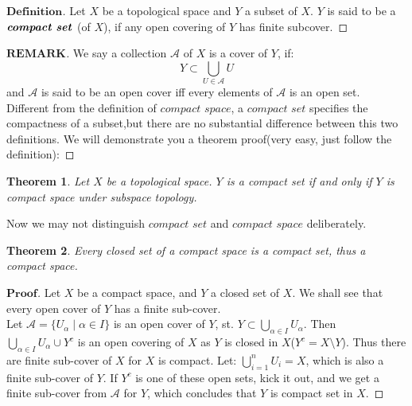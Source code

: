 \documentclass[a4paper, 11pt]{article}
\newtheorem{theorem}{Theorem}
\theoremstyle{definition}
\theoremstyle{remark}
\newenvironment{myremark}
{\renewcommand\qedsymbol{$ $}\begin{proof}[$\mathbf{REMARK}$]}
  {\end{proof}}
\newenvironment{myprf}
{\renewcommand\qedsymbol{$ $}\begin{proof}[$\mathbf{Proof}$]}
  {\end{proof}}
\newenvironment{mydef}
{\renewcommand\qedsymbol{$ $}\begin{proof}[$\mathbf{Definition}$]}
  {\end{proof}}
\theoremstyle{definition}
\begin{document}
\vspace{0.5cm}
\begin{mydef}
      Let $X$ be a topological space and $Y$ a subset of $X$. $Y$ is said to be 
      a $\textbf{\textit{compact set}}$ (of $X$), 
      if any open covering of $Y$ has finite subcover.
\end{mydef}
\begin{myremark}
        We say a collection $\mathcal{A}$ of $X$ is a cover of $Y$, if:
        $$
        Y\subset \bigcup_{U\in \mathcal{A}}U
        $$ and $\mathcal{A}$ is said to be an open cover iff every elements of
        $\mathcal{A}$ is an open set.\\
        \indent Different from the definition of $\textit{compact space}$, a
        $\textit{compact set}$ specifies the compactness of a subset,but there
        are no substantial difference between this two definitions. We will
        demonstrate you a theorem proof(very easy, just follow the 
        definition):
\end{myremark}
\begin{theorem}
        Let $X$ be a topological space. $Y$ is a compact set if and only if $Y$
        is compact space under subspace topology.
\end{theorem}
\noindent
Now we may not distinguish $\textit{compact set}$ and $\textit{compact space}$ 
deliberately.
\vspace{0.5cm}
\begin{theorem}
        Every closed set of a compact space is a compact set, thus a compact
        space.
\end{theorem}
\begin{myprf}
       Let $X$ be a compact space, and $Y$ a closed set of $X$. We shall see that
       every open cover of $Y$ has a finite sub-cover.\\
       \indent Let $\mathcal{A}=\{U_{\alpha}\mid \alpha\in I\}$ is an open cover
       of $Y$, st. $Y\subset \displaystyle \bigcup_{\alpha\in I} U_{\alpha}$.
       Then $\displaystyle \bigcup_{\alpha\in I}U_{\alpha} \cup Y^{c}$ is an open
       covering of $X$ as $Y$ is closed in $X$($Y^{c}=X\setminus Y$). Thus there
       are finite sub-cover of $X$ for $X$ is compact.  Let: $
       \displaystyle \bigcup_{i=1}^{n}U_i=X$,  which is also a finite sub-cover
       of $Y$. If $Y^{c}$ is one of these open sets, kick it out, and we get a 
       finite sub-cover from $\mathcal{A}$ for $Y$, which concludes that $Y$ 
       is compact set in $X$.
\end{myprf}
\vspace{0.5cm}
\end{document}
